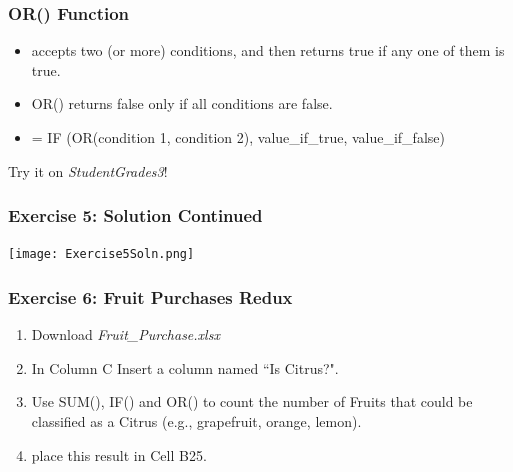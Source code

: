 \documentclass[12pt]{beamer}
\begin{document}
\begin{frame}
	\frametitle{OR() Function}
	\begin{itemize}
	\item accepts two (or more) conditions, and then returns true if any one of them is true.
	\item OR() returns false only if all conditions are false.
	\item = IF (OR(condition 1, condition 2), value\_if\_true, value\_if\_false)
	\end{itemize}
\bigskip
Try it on \textit{StudentGrades3}!
\end{frame}
\begin{frame}
	\frametitle{Exercise 5: Solution Continued}
	\begin{center}
		\texttt{[image: Exercise5Soln.png]}
	\end{center}
\end{frame}
\begin{frame}
	\frametitle{Exercise 6: Fruit Purchases Redux}
	\begin{enumerate}
		\item Download \textit{Fruit\_Purchase.xlsx}
		\item In Column C Insert a column named ``Is Citrus?". 
		\item Use  SUM(), IF() and OR() to count the number of Fruits that could be classified as a Citrus (e.g., grapefruit, orange, lemon).
		\item place this result in Cell B25.
	\end{enumerate}
\end{frame}
\end{document}
